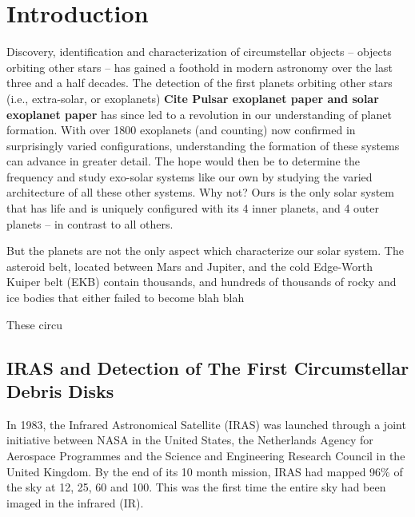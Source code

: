 \section{Introduction}\label{sec:intro}
    
    Discovery, identification and characterization of circumstellar objects -- objects orbiting other stars -- has gained a foothold in modern astronomy over the last three and a half decades. The detection of the first planets orbiting other stars (i.e., extra-solar, or exoplanets) \textbf{Cite Pulsar exoplanet paper and solar exoplanet paper} has since led to a revolution in our understanding of planet formation. With over 1800 exoplanets (and counting) now confirmed in surprisingly varied configurations, understanding the formation of these systems can advance in greater detail. The hope would then be to determine the frequency and study exo-solar systems like our own by studying the varied architecture of all these other systems. Why not? Ours is the only solar system that has life and is uniquely configured with its 4 inner planets, and 4 outer planets -- in contrast to all others. 
    
    But the planets are not the only aspect which characterize our solar system. The asteroid belt, located between Mars and Jupiter, and the cold Edge-Worth Kuiper belt (EKB) contain thousands, and hundreds of thousands of rocky and ice bodies that either failed to become blah blah
    
    
    These circu
    
  
    \subsection{IRAS and Detection of The First Circumstellar Debris Disks }\label{sec:1stdisk_iras}
    
    In 1983, the Infrared Astronomical Satellite (IRAS) was launched through a joint initiative between NASA in the United States, the Netherlands Agency for Aerospace Programmes and the Science and Engineering Research Council in the United Kingdom. By the end of its 10 month mission, IRAS had mapped 96\% of the sky at 12, 25, 60 and 100\micron. This was the first time the entire sky had been imaged in the infrared (IR). 
    
